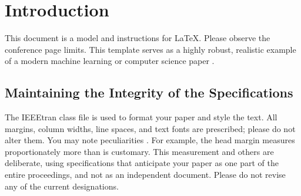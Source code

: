 \section{Introduction}
This document is a model and instructions for \LaTeX.
Please observe the conference page limits. This template serves as a highly robust, realistic example of a modern machine learning or computer science paper \cite{einstein1905}.

\subsection{Maintaining the Integrity of the Specifications}
The IEEEtran class file is used to format your paper and style the text. All margins, 
column widths, line spaces, and text fonts are prescribed; please do not 
alter them. You may note peculiarities \cite{turing1950}. For example, the head margin
measures proportionately more than is customary. This measurement 
and others are deliberate, using specifications that anticipate your paper 
as one part of the entire proceedings, and not as an independent document. 
Please do not revise any of the current designations.
